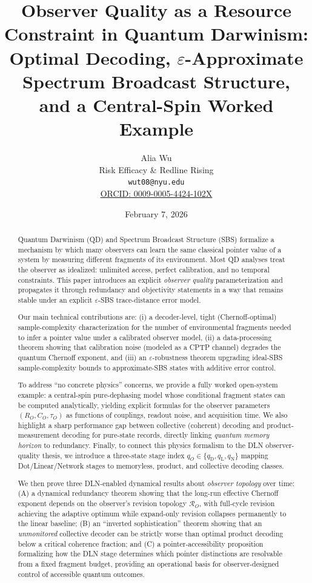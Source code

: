 \documentclass[11pt]{article}
\title{\bf Observer Quality as a Resource Constraint in Quantum Darwinism:\\
Optimal Decoding, $\varepsilon$-Approximate Spectrum Broadcast Structure,\\
and a Central-Spin Worked Example}
\author{
Alia Wu\\
Risk Efficacy \& Redline Rising\\
\texttt{wut08@nyu.edu}\\
\href{https://orcid.org/0009-0005-4424-102X}{ORCID: 0009-0005-4424-102X}
}
\date{February 7, 2026}
\newcommand{\cR}{\mathcal{R}}
\newcommand{\1}{\mathbf{1}}
\theoremstyle{definition}
\theoremstyle{plain}
\begin{document}
\maketitle

\begin{abstract}
Quantum Darwinism (QD) and Spectrum Broadcast Structure (SBS) formalize a mechanism by which many observers can learn the same classical pointer value of a system by measuring different fragments of its environment.
Most QD analyses treat the observer as idealized: unlimited access, perfect calibration, and no temporal constraints.
This paper introduces an explicit \emph{observer quality} parameterization and propagates it through redundancy and objectivity statements in a way that remains stable under an explicit $\varepsilon$-SBS trace-distance error model.

Our main technical contributions are:
(i) a decoder-level, tight (Chernoff-optimal) sample-complexity characterization for the number of environmental fragments needed to infer a pointer value under a calibrated observer model,
(ii) a data-processing theorem showing that calibration noise (modeled as a CPTP channel) degrades the quantum Chernoff exponent, and
(iii) an $\varepsilon$-robustness theorem upgrading ideal-SBS sample-complexity bounds to approximate-SBS states with additive error control.

To address ``no concrete physics'' concerns, we provide a fully worked open-system example: a central-spin pure-dephasing model whose conditional fragment states can be computed analytically, yielding explicit formulas for the observer parameters $(R_O,C_O,\tau_O)$ as functions of couplings, readout noise, and acquisition time.
We also highlight a sharp performance gap between collective (coherent) decoding and product-measurement decoding for pure-state records, directly linking \emph{quantum memory horizon} to redundancy.
Finally, to connect this physics formalism to the DLN observer-quality thesis, we introduce a three-state stage index $q_O\in\{q_{\mathrm{D}},q_{\mathrm{L}},q_{\mathrm{N}}\}$ mapping Dot/Linear/Network stages to memoryless, product, and collective decoding classes.

We then prove three DLN-enabled dynamical results about \emph{observer topology} over time: (A) a dynamical redundancy theorem showing that the long-run effective Chernoff exponent depends on the observer's revision topology $\cR_O$, with full-cycle revision achieving the adaptive optimum while expand-only revision collapses permanently to the linear baseline; (B) an ``inverted sophistication'' theorem showing that an \emph{unmonitored} collective decoder can be strictly worse than optimal product decoding below a critical coherence fraction; and (C) a pointer-accessibility proposition formalizing how the DLN stage determines which pointer distinctions are resolvable from a fixed fragment budget, providing an operational basis for observer-designed control of accessible quantum outcomes.
\end{abstract}
\end{document}
